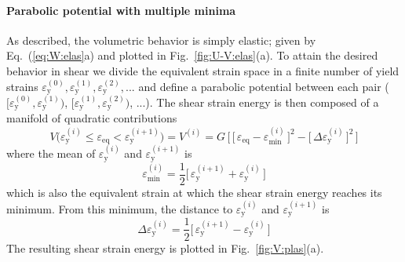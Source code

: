 \documentclass[times,namecite]{goose-article}
\begin{document}
\paragraph{Parabolic potential with multiple minima}

As described, the volumetric behavior is simply elastic; given by Eq.~(\ref{eq:W:elas}a) and plotted in Fig.~\ref{fig:U-V:elas}(a). To attain the desired behavior in shear we divide the equivalent strain space in a finite number of yield strains $\varepsilon_\mathrm{y}^{(0)}, \varepsilon_\mathrm{y}^{(1)}, \varepsilon_\mathrm{y}^{(2)}, ...$ and define a parabolic potential between each pair ($[ \varepsilon_\mathrm{y}^{(0)}, \varepsilon_\mathrm{y}^{(1)} )$, $[ \varepsilon_\mathrm{y}^{(1)}, \varepsilon_\mathrm{y}^{(2)} )$, ...). The shear strain energy is then composed of a manifold of quadratic contributions
\begin{equation}\label{eq:V-plas}
  V \big(
    \varepsilon_\mathrm{y}^{(i)} \leq \varepsilon_\mathrm{eq} < \varepsilon_\mathrm{y}^{(i+1)}
  \big)
  =
  V^{(i)}
  =
  G \, \bigg[\,
    \Big[\, \varepsilon_\mathrm{eq} - \varepsilon_\mathrm{min}^{(i)} \,\Big]^2
    -
    \Big[\, \Delta \varepsilon_\mathrm{y}^{(i)} \,\Big]^2
  \,\bigg]
\end{equation}
where the mean of $\varepsilon_\mathrm{y}^{(i)}$ and $\varepsilon_\mathrm{y}^{(i+1)}$ is
\begin{equation}
  \varepsilon_\mathrm{min}^{(i)}
  =
  \frac{1}{2} \Big[\, \varepsilon_\mathrm{y}^{(i+1)} + \varepsilon_\mathrm{y}^{(i)} \,\Big]
\end{equation}
which is also the equivalent strain at which the shear strain energy reaches its minimum. From this minimum, the distance to $\varepsilon_\mathrm{y}^{(i)}$ and $\varepsilon_\mathrm{y}^{(i+1)}$ is
\begin{equation}
  \Delta \varepsilon_\mathrm{y}^{(i)}
  =
  \frac{1}{2} \Big[\, \varepsilon_\mathrm{y}^{(i+1)} - \varepsilon_\mathrm{y}^{(i)} \,\Big]
\end{equation}
The resulting shear strain energy is plotted in Fig.~\ref{fig:V:plas}(a).
\end{document}
